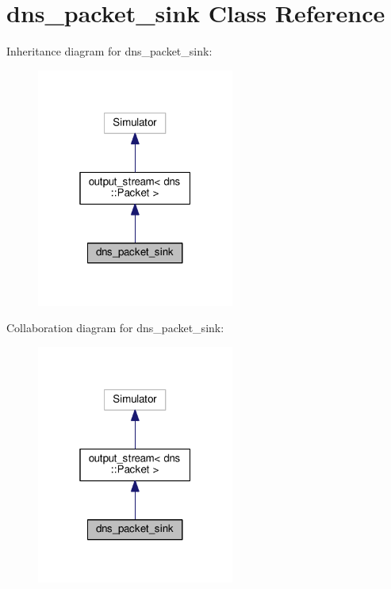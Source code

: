 \hypertarget{classdns__packet__sink}{}\section{dns\+\_\+packet\+\_\+sink Class Reference}
\label{classdns__packet__sink}


Inheritance diagram for dns\+\_\+packet\+\_\+sink\+:\nopagebreak
\begin{figure}[H]
\begin{center}
\leavevmode
\includegraphics[width=184pt]{classdns__packet__sink__inherit__graph}
\end{center}
\end{figure}


Collaboration diagram for dns\+\_\+packet\+\_\+sink\+:\nopagebreak
\begin{figure}[H]
\begin{center}
\leavevmode
\includegraphics[width=184pt]{classdns__packet__sink__coll__graph}
\end{center}
\end{figure}
